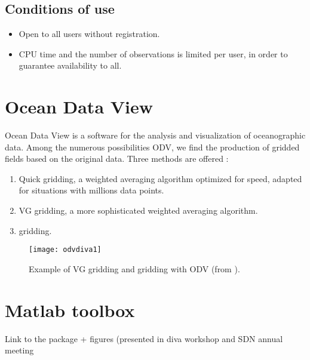 \subsection{Conditions of use}


\begin{itemize}
\item Open to all users without registration.
\item CPU time and the number of observations is limited per user, in order to guarantee availability to all.
\end{itemize}


\section{Ocean Data View}

Ocean Data View \citep[ODV,][]{SCHLITZER02} is a software for the analysis and visualization of oceanographic data. Among the numerous possibilities ODV, we find the production of gridded fields based on the original data. Three methods are offered \citep{SCHLITZER12}: 
\begin{enumerate}
\item Quick gridding, a weighted averaging algorithm optimized for speed, adapted for situations with millions data points.
\item VG gridding, a more sophisticated weighted averaging algorithm.
\item \diva gridding.
\end{enumerate}

\begin{figure}[H]
\centering 
\texttt{[image: odvdiva1]}
\caption{Example of VG gridding and \diva gridding with ODV (from \citet{SCHLITZER12}).\label{fig:divaonweb6}}
\end{figure}

\section{Matlab toolbox}

Link to the package +
figures (presented in diva workshop and SDN annual meeting